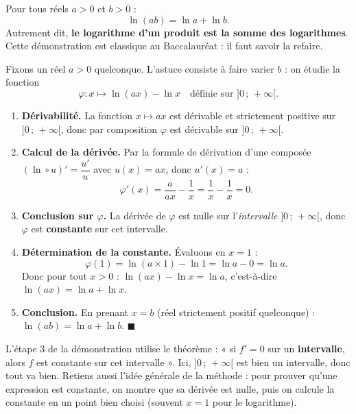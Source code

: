 \documentclass[11pt]{article}
\begin{document}
\begin{propriete}
Pour tous réels $a > 0$ et $b > 0$ :
\[
\ln(ab) = \ln a + \ln b.
\]
Autrement dit, \textbf{le logarithme d'un produit est la somme des logarithmes}. Cette démonstration est classique au Baccalauréat : il faut savoir la refaire.
\end{propriete}

\begin{experience}
Fixons un réel $a > 0$ quelconque. L'astuce consiste à faire varier $b$ : on étudie la fonction
\[
\varphi : x \longmapsto \ln(ax) - \ln x \quad \text{définie sur } ]0\,;\,+\infty[.
\]
\begin{enumerate}
\item \textbf{Dérivabilité.} La fonction $x \mapsto ax$ est dérivable et strictement positive sur $]0\,;\,+\infty[$, donc par composition $\varphi$ est dérivable sur $]0\,;\,+\infty[$.
\item \textbf{Calcul de la dérivée.} Par la formule de dérivation d'une composée $(\ln \circ u)' = \dfrac{u'}{u}$ avec $u(x) = ax$, donc $u'(x) = a$ :
\[
\varphi'(x) = \frac{a}{ax} - \frac{1}{x} = \frac{1}{x} - \frac{1}{x} = 0.
\]
\item \textbf{Conclusion sur $\varphi$.} La dérivée de $\varphi$ est nulle sur l'\emph{intervalle} $]0\,;\,+\infty[$, donc $\varphi$ est \textbf{constante} sur cet intervalle.
\item \textbf{Détermination de la constante.} Évaluons en $x = 1$ :
\[
\varphi(1) = \ln(a \times 1) - \ln 1 = \ln a - 0 = \ln a.
\]
Donc pour tout $x > 0$ : $\ln(ax) - \ln x = \ln a$, c'est-à-dire $\ln(ax) = \ln a + \ln x$.
\item \textbf{Conclusion.} En prenant $x = b$ (réel strictement positif quelconque) : $\ln(ab) = \ln a + \ln b$. \hfill$\blacksquare$
\end{enumerate}
\end{experience}

\begin{attention}
L'étape 3 de la démonstration utilise le théorème : « si $f' = 0$ sur un \textbf{intervalle}, alors $f$ est constante sur cet intervalle ». Ici, $]0\,;\,+\infty[$ est bien un intervalle, donc tout va bien. Retiens aussi l'idée générale de la méthode : pour prouver qu'une expression est constante, on montre que sa dérivée est nulle, puis on calcule la constante en un point bien choisi (souvent $x = 1$ pour le logarithme).
\end{attention}
\end{document}
